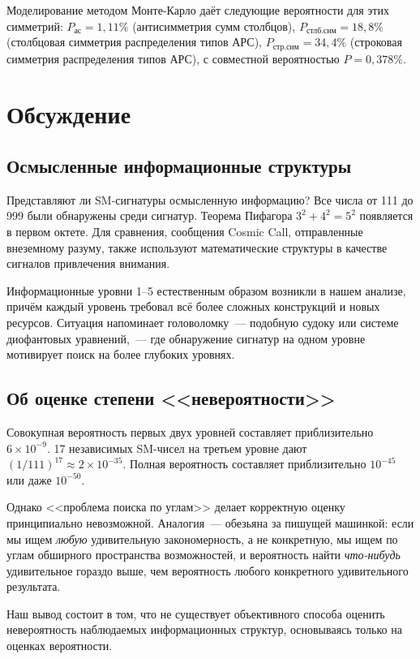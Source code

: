 \documentclass[12pt]{article}
\begin{document}
Моделирование методом Монте-Карло даёт следующие вероятности для этих симметрий: $P_{\text{ас}} = 1{,}11\%$ (антисимметрия сумм столбцов), $P_{\text{стлб.сим}} = 18{,}8\%$ (столбцовая симметрия распределения типов АРС), $P_{\text{стр.сим}} = 34{,}4\%$ (строковая симметрия распределения типов АРС), с совместной вероятностью $P = 0{,}378\%$.


\section{Обсуждение}

\subsection{Осмысленные информационные структуры}

Представляют ли SM-сигнатуры осмысленную информацию? Все числа от 111 до 999 были обнаружены среди сигнатур. Теорема Пифагора $3^2 + 4^2 = 5^2$ появляется в первом октете. Для сравнения, сообщения Cosmic Call, отправленные внеземному разуму, также используют математические структуры в качестве сигналов привлечения внимания.

Информационные уровни 1--5 естественным образом возникли в нашем анализе, причём каждый уровень требовал всё более сложных конструкций и новых ресурсов. Ситуация напоминает головоломку~--- подобную судоку или системе диофантовых уравнений,~--- где обнаружение сигнатур на одном уровне мотивирует поиск на более глубоких уровнях.

\subsection{Об оценке степени <<невероятности>>}

Совокупная вероятность первых двух уровней составляет приблизительно $6 \times 10^{-9}$. 17 независимых SM-чисел на третьем уровне дают $(1/111)^{17} \approx 2 \times 10^{-35}$. Полная вероятность составляет приблизительно $10^{-45}$ или даже $10^{-50}$.

Однако <<проблема поиска по углам>> делает корректную оценку принципиально невозможной. Аналогия~--- обезьяна за пишущей машинкой: если мы ищем \emph{любую} удивительную закономерность, а не конкретную, мы ищем по углам обширного пространства возможностей, и вероятность найти \emph{что-нибудь} удивительное гораздо выше, чем вероятность любого конкретного удивительного результата.

Наш вывод состоит в том, что не существует объективного способа оценить невероятность наблюдаемых информационных структур, основываясь только на оценках вероятности.
\end{document}

